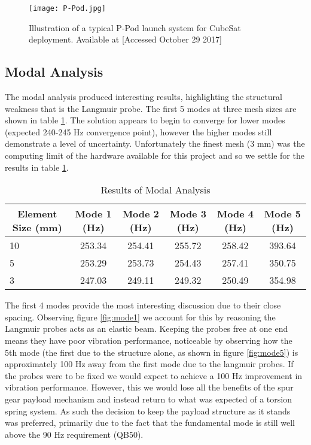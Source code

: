  \begin{figure}[H]
 \centering	
 \texttt{[image: P-Pod.jpg]}
 \caption{Illustration of a typical P-Pod launch system for CubeSat deployment. Available at  [Accessed October 29 2017]}
 \label{fig:P-Pod}
 \end{figure}
 
\subsection{Modal Analysis}
The modal analysis produced interesting results, highlighting the structural weakness that is the Langmuir probe. The first 5 modes at three mesh sizes are shown in table \ref{table:modes}. The solution appears to begin to converge for lower modes (expected 240-245 Hz convergence point), however the higher modes still demonstrate a level of uncertainty. Unfortunately the finest mesh (3 mm) was the computing limit of the hardware available for this project and so we settle for the results in table \ref{table:modes}. \\

\begin{table}[]
\centering
\begin{tabular}{@{}lccccc@{}}
\toprule
\multicolumn{1}{c}{\textbf{Element Size (mm)}} & \textbf{Mode 1 (Hz)} & \textbf{Mode 2 (Hz)} & \textbf{Mode 3 (Hz)} & \textbf{Mode 4 (Hz)} & \textbf{Mode 5 (Hz)} \\ \midrule
10                                             & 253.34               & 254.41               & 255.72               & 258.42               & 393.64               \\
5                                              & 253.29               & 253.73               & 254.43               & 257.41               & 350.75               \\
3                                              & 247.03               & 249.11               & 249.32               & 250.49               & 354.98               \\ \bottomrule
\end{tabular}\caption{Results of Modal Analysis}
\label{table:modes}
\end{table} 

The first 4 modes provide the most interesting discussion due to their close spacing. Observing figure \ref{fig:mode1} we account for this by reasoning the Langmuir probes acts as an elastic beam. Keeping the probes free at one end means they have poor vibration performance, noticeable by observing how the 5th mode (the first due to the structure alone, as shown in figure \ref{fig:mode5}) is approximately 100 Hz away from the first mode due to the langmuir probes. If the probes were to be fixed we would expect to achieve a 100 Hz improvement in vibration performance. However, this we would lose all the benefits of the spur gear payload mechanism and instead return to what was expected of a torsion spring system. As such the decision to keep the payload structure as it stands was preferred, primarily due to the fact that the fundamental mode is still well above the 90 Hz requirement (QB50). 

